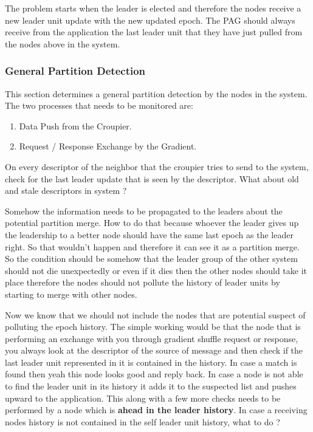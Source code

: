 \documentclass[a4paper, 11pt]{article}
\begin{document}
The problem starts when the leader is elected and therefore the nodes receive a new leader unit update with the new updated epoch. The PAG should always receive from the application the last leader unit that they have just pulled from the nodes above in the system.

\subsubsection{General Partition Detection}
This section determines a general partition detection by the nodes in the system. The two processes that needs to be monitored are:

\begin{enumerate}

\item Data Push from the Croupier.
\item Request / Response Exchange by the Gradient.

\end{enumerate}

On every descriptor of the neighbor that the croupier tries to send to the system, check for the last leader update that is seen by the descriptor. What about old and stale descriptors in system ?

Somehow the information needs to be propagated to the leaders about the potential partition merge. How to do that because whoever the leader gives up the leadership to a better node should have the same last epoch as the leader right. So that wouldn't happen and therefore it can see it as a partition merge. So the condition should be somehow that the leader group of the other system should not die unexpectedly or even if it dies then the other nodes should take it place therefore the nodes should not pollute the history of leader units by starting to merge with other nodes.

Now we know that we should not include the nodes that are potential suspect of polluting the epoch history. The simple working would be that the node that is performing an exchange with you through gradient shuffle request or response, you always look at the descriptor of the source of message and then check if the last leader unit represented in it is contained in the history. In case a match is found then yeah this node looks good and reply back. In case a node is not able to find the leader unit in its history it adds it to the suspected list and pushes upward to the application. This along with a few more checks needs to be performed by a node which is \textbf{ahead in the leader history}. In case a receiving nodes history is not contained in the self leader unit history, what to do ?\\
\end{document}
